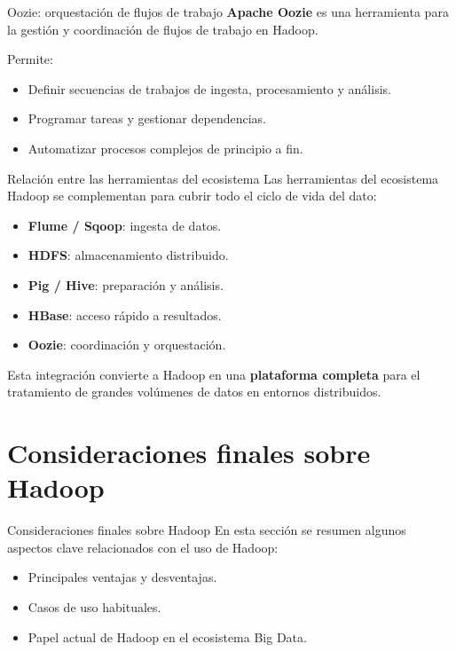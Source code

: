 \documentclass{beamer}
\begin{document}
\begin{frame}{Oozie: orquestación de flujos de trabajo}
\textbf{Apache Oozie} es una herramienta para la gestión y coordinación de flujos de trabajo en Hadoop.

Permite:
\begin{itemize}
    \item Definir secuencias de trabajos de ingesta, procesamiento y análisis.
    \item Programar tareas y gestionar dependencias.
    \item Automatizar procesos complejos de principio a fin.
\end{itemize}
\end{frame}

\begin{frame}{Relación entre las herramientas del ecosistema}
Las herramientas del ecosistema Hadoop se complementan para cubrir todo el ciclo de vida del dato:
\begin{itemize}
    \item \textbf{Flume / Sqoop}: ingesta de datos.
    \item \textbf{HDFS}: almacenamiento distribuido.
    \item \textbf{Pig / Hive}: preparación y análisis.
    \item \textbf{HBase}: acceso rápido a resultados.
    \item \textbf{Oozie}: coordinación y orquestación.
\end{itemize}

Esta integración convierte a Hadoop en una \textbf{plataforma completa} para el tratamiento de grandes volúmenes de datos en entornos distribuidos.
\end{frame}


\section{Consideraciones finales sobre Hadoop}

\begin{frame}{Consideraciones finales sobre Hadoop}
En esta sección se resumen algunos aspectos clave relacionados con el uso de Hadoop:
\begin{itemize}
    \item Principales ventajas y desventajas.
    \item Casos de uso habituales.
    \item Papel actual de Hadoop en el ecosistema Big Data.
\end{itemize}
\end{frame}
\end{document}
